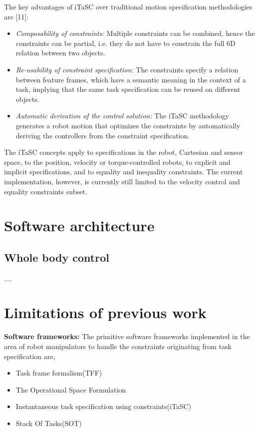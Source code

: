 {The key advantages of iTaSC over traditional motion specification methodologies are [11]:
\begin{itemize}
	\item \textit{Composability of constraints: }Multiple constraints can be combined, hence the constraints can be partial, i.e. they do not have to constrain the full 6D relation between two objects.
	\item \textit{Re-usability of constraint specification:} The constraints specify a relation between feature frames, which have a semantic meaning in the context of a task, implying that the same task specification can be reused on different objects.
	\item \textit{Automatic derivation of the control solution:} The iTaSC methodology generates a robot motion that optimizes the constraints by automatically deriving the controllers from the constraint specification.
\end{itemize}
The iTaSC concepts apply to specifications in the robot, Cartesian and sensor space, to the position, velocity or torque-controlled robots, to explicit and implicit specifications, and to equality and inequality constraints. The current implementation, however, is currently still limited to the velocity control and equality constraints subset.

\section{Software architecture}
\subsection{Whole body control}{....}

\section{Limitations of previous work}

\textbf{Software frameworks: }The primitive software frameworks implemented in the area of robot manipulators to handle the constraints originating from task specification are,
\begin{itemize}
\item Task frame formalism(TFF)
\item The Operational Space Formulation
\item Instantaneous task specification using constraints(iTaSC)
\item Stack Of Tasks(SOT)
\end{itemize}

}
